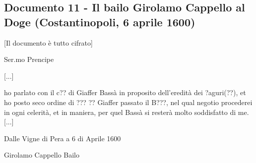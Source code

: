 \subsection{Documento 11 - Il bailo Girolamo Cappello al Doge (Costantinopoli, 6 aprile 1600)}

[Il documento è tutto cifrato]

\begin{center}
Ser.mo Prencipe
\end{center}

[...]

ho parlato con il c?? di Giaffer Bassà in proposito dell'eredità dei ?aguri(??), et ho posto seco ordine di ??? ?? Giaffer passato il B???, nel qual negotio procederei in ogni celerità, et in maniera, per quel Bassà si resterà  molto soddisfatto di me. [...]

Dalle Vigne di Pera a 6 di Aprile 1600

\begin{raggedright}
Girolamo Cappello Bailo
\end{raggedright}

